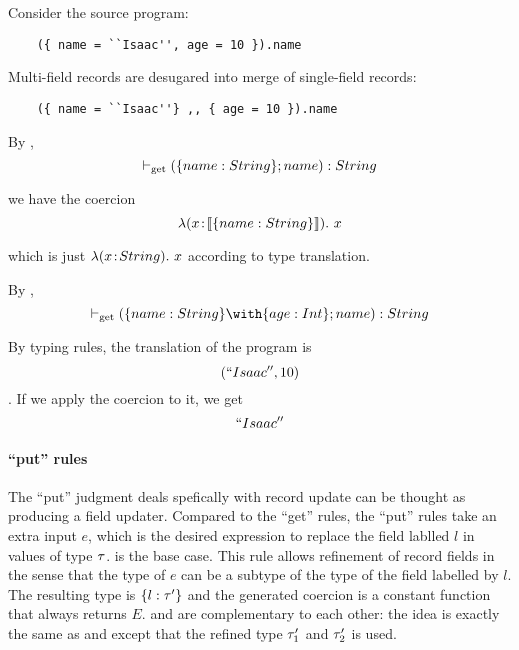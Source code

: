   Consider the source program:
  \begin{lstlisting}
    ({ name = ``Isaac'', age = 10 }).name
  \end{lstlisting}

  Multi-field records are desugared into merge of single-field records:
  \begin{lstlisting}
    ({ name = ``Isaac''} ,, { age = 10 }).name
  \end{lstlisting}

  By ,
  \[ \vdash_{\textrm{get}} (\{ name : String \}; {name}) : String \]

  we have the coercion
  \[ \lambda (x \!:\! \llbracket {\{ name : String \}} \rrbracket).~ x \]

  which is just $ \lambda (x \!:\! String).~ x $ according to type translation.

  By ,
  \[ \turnsget (\recty {name} {String} \intersects \recty {age} {Int}; {name}) : String \]


  By typing rules, the translation of the program is
  \[ (``Isaac'', 10) \]. If we apply the coercion to it, we get
  \[ ``Isaac'' \]


\paragraph{``put'' rules}

  The ``put'' judgment deals spefically with record update can be thought as
  producing a field updater. Compared to the ``get'' rules, the ``put'' rules
  take an extra input $ e $, which is the desired expression to replace the
  field lablled $ l $ in values of type $ \tau $.  is the base
  case. This rule allows refinement of record fields in the sense that the type
  of $ e $ can be a subtype of the type of the field labelled by $ l $. The
  resulting type is $ \{ l : \tau' \} $ and the generated coercion is a
  constant function that always returns $ E $.  and
   are complementary to each other: the idea is exactly the
  same as  and  except that the refined type
  $ \tau_1' $ and $ \tau_2' $ is used.

